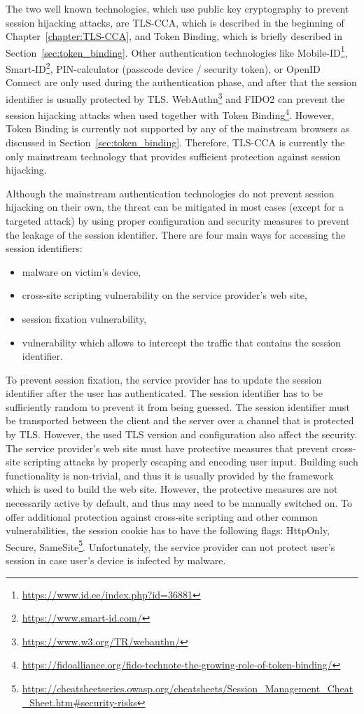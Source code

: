 The two well known technologies, which use public key cryptography to prevent session hijacking attacks, are TLS-CCA, which is described in the beginning of Chapter~\ref{chapter:TLS-CCA}, and Token Binding, which is briefly described in Section~\ref{sec:token_binding}. Other authentication technologies like Mobile-ID\footnote{\url{https://www.id.ee/index.php?id=36881}}, Smart-ID\footnote{\url{https://www.smart-id.com/}}, PIN-calculator (passcode device / security token), or OpenID Connect are only used during the authentication phase, and after that the session identifier is usually protected by TLS. WebAuthn\footnote{\url{https://www.w3.org/TR/webauthn/}} and FIDO2 can prevent the session hijacking attacks when used together with Token Binding\footnote{\url{https://fidoalliance.org/fido-technote-the-growing-role-of-token-binding/}}. However, Token Binding is currently not supported by any of the mainstream browsers as discussed in Section~\ref{sec:token_binding}. Therefore, TLS-CCA is currently the only mainstream technology that provides sufficient protection against session hijacking.

Although the mainstream authentication technologies do not prevent session hijacking on their own, the threat can be mitigated in most cases (except for a targeted attack) by using proper configuration and security measures to prevent the leakage of the session identifier. There are four main ways for accessing the session identifiers:
\begin{itemize}
	\item malware on victim's device,
	\item cross-site scripting vulnerability on the service provider's web site, 
	\item session fixation vulnerability, 
	\item vulnerability which allows to intercept the traffic that contains the session identifier.
\end{itemize}
To prevent session fixation, the service provider has to update the session identifier after the user has authenticated. The session identifier has to be sufficiently random to prevent it from being guessed. The session identifier must be transported between the client and the server over a channel that is protected by TLS. However, the used TLS version and configuration also affect the security. The service provider's web site must have protective measures that prevent cross-site scripting attacks by properly escaping and encoding user input. Building such functionality is non-trivial, and thus it is usually provided by the framework which is used to build the web site. However, the protective measures are not necessarily active by default, and thus may need to be manually switched on. To offer additional protection against cross-site scripting and other common vulnerabilities, the session cookie has to have the following flags: HttpOnly, Secure, SameSite\footnote{\url{https://cheatsheetseries.owasp.org/cheatsheets/Session_Management_Cheat_Sheet.htm\#security-risks}}. Unfortunately, the service provider can not protect user's session in case user's device is infected by malware.






